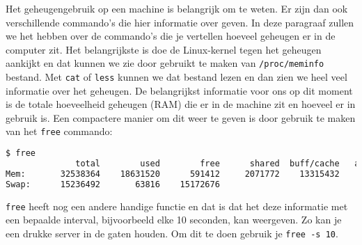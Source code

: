 Het geheugengebruik op een machine is belangrijk om te weten. Er zijn dan ook verschillende commando's die hier informatie over geven. In deze paragraaf zullen we het hebben over de commando's die je vertellen hoeveel geheugen er in de computer zit. Het belangrijkste is doe de Linux-kernel tegen het geheugen aankijkt en dat kunnen we zie door gebruikt te maken van \texttt{/proc/meminfo} bestand. Met \texttt{cat} of \texttt{less} kunnen we dat bestand lezen en dan zien we heel veel informatie over het geheugen. De belangrijkst informatie voor ons op dit moment is de totale hoeveelheid geheugen (RAM) die er in de machine zit en hoeveel er in gebruik is. Een compactere manier om dit weer te geven is door gebruik te maken van het \texttt{free} commando:
\begin{lstlisting}[language=bash]
$ free 
              total        used        free      shared  buff/cache   available
Mem:       32538364    18631520      591412     2071772    13315432    11378676
Swap:      15236492       63816    15172676
\end{lstlisting}
\texttt{free} heeft nog een andere handige functie en dat is dat het deze informatie met een bepaalde interval, bijvoorbeeld elke 10 seconden, kan weergeven. Zo kan je een drukke server in de gaten houden. Om dit te doen gebruik je \texttt{free -s 10}.
